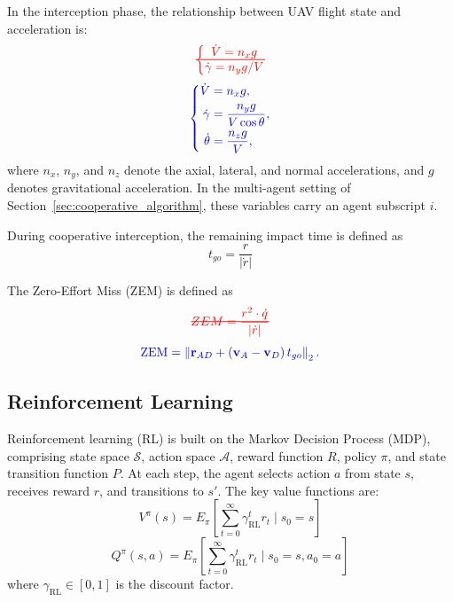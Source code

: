 \documentclass[lettersize,journal]{IEEEtran}
\newcommand{\hladd}[1]{{\color{blue}#1}}
\newcommand{\hldeleq}[1]{%
  {\color{red}%
   \sbox0{$\displaystyle #1$}%
   \rlap{\usebox0}%
   \rule[0.5\dimexpr\ht0-\dp0\relax]{\wd0}{0.6pt}}}
\begin{document}
In the interception phase, the relationship between UAV flight state and acceleration is:
\begin{equation*}
\hldeleq{\left\{\begin{matrix}\dot{V} =n_{x} g \\
\dot{\gamma} =n_{y}g/V \end{matrix}\right.}
\end{equation*}
\begin{equation}
\label{guozai3d}
{\color{blue}\left\{\begin{aligned}
\dot{V}&=n_x g,\\
\dot{\gamma}&=\frac{n_y g}{V\cos\theta},\\
\dot{\theta}&=\frac{n_z g}{V},
\end{aligned}\right.}
\end{equation}
\hladd{where $n_x$, $n_y$, and $n_z$ denote the axial, lateral, and normal
accelerations, and $g$ denotes gravitational acceleration.}
In the multi-agent setting of Section~\ref{sec:cooperative_algorithm}, these variables carry
an agent subscript $i$.

During cooperative interception, the remaining impact time is defined as
\begin{equation}
\label{shijian}
t_{go}=\frac{r}{\left|\dot{r}\right|}
\end{equation}

The Zero-Effort Miss (ZEM) is defined as
\begin{equation*}
\hldeleq{ZEM = \frac{r^{2}\cdot\dot{q}}{\left|\dot{r}\right|}}
\end{equation*}
\begin{equation}
\label{ZEM3d}
{\color{blue}\operatorname{ZEM}=\left\|\mathbf{r}_{AD}+(\mathbf{v}_A-\mathbf{v}_D)\,t_{go}\right\|_2.}
\end{equation}

\subsection{Reinforcement Learning}

Reinforcement learning (RL) is built on the Markov Decision Process (MDP), comprising state
space $\mathcal{S}$, action space $\mathcal{A}$, reward function $R$, policy $\pi$, and state
transition function $P$.
At each step, the agent selects action $a$ from state $s$, receives reward $r$, and
transitions to $s'$.
The key value functions are:
\begin{equation}
\label{RLV}
V^{\pi}(s)=E_{\pi}\left[\sum_{t=0}^{\infty}\gamma_{\mathrm{RL}}^{t}r_{t}\mid s_{0}=s\right]
\end{equation}
\begin{equation}
\label{RLQ}
Q^{\pi}(s,a)=E_{\pi}\left[\sum_{t=0}^{\infty}\gamma_{\mathrm{RL}}^{t}r_{t}\mid s_{0}=s,a_{0}=a\right]
\end{equation}
where $\gamma_{\mathrm{RL}}\in[0,1]$ is the discount factor.
\end{document}
